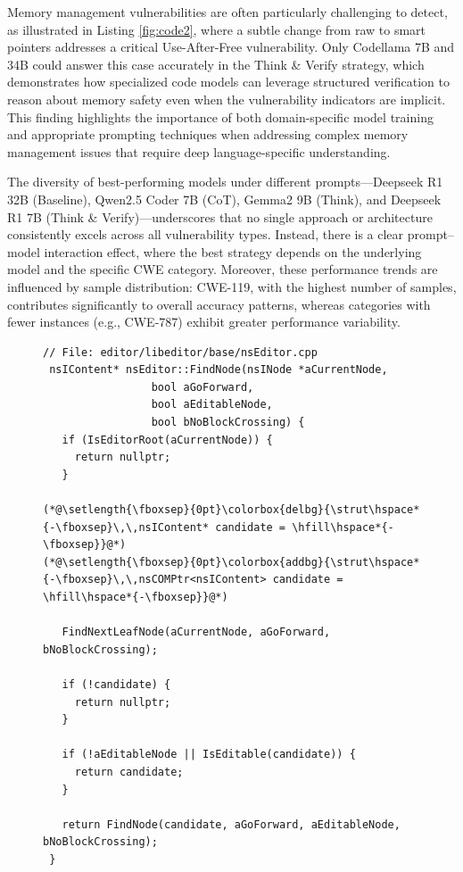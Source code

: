 \documentclass[sigconf]{acmart}
\begin{document}
Memory management vulnerabilities are often particularly challenging to detect, as illustrated in Listing \ref{fig:code2}, where a subtle change from raw to smart pointers addresses a critical Use-After-Free vulnerability. Only Codellama 7B and 34B could answer this case accurately in the Think \& Verify strategy, which demonstrates how specialized code models can leverage structured verification to reason about memory safety even when the vulnerability indicators are implicit. This finding highlights the importance of both domain-specific model training and appropriate prompting techniques when addressing complex memory management issues that require deep language-specific understanding.

The diversity of best-performing models under different prompts—Deepseek R1 32B (Baseline), Qwen2.5 Coder 7B (CoT), Gemma2 9B (Think), and Deepseek R1 7B (Think \& Verify)—underscores that no single approach or architecture consistently excels across all vulnerability types. Instead, there is a clear prompt–model interaction effect, where the best strategy depends on the underlying model and the specific CWE category. Moreover, these performance trends are influenced by sample distribution: CWE-119, with the highest number of samples, contributes significantly to overall accuracy patterns, whereas categories with fewer instances (e.g., CWE-787) exhibit greater performance variability.

\begin{figure}[ht]
\centering
\begin{lstlisting}[style=cstylediff,
  caption={CVE-2012-4213 (CWE-416: Use-After-Free) in Mozilla's \texttt{nsEditor::FindNode}. The vulnerable version (red) uses a raw pointer for \texttt{candidate}, leading to potential use-after-free issues. The patched version (green) replaces it with an \texttt{nsCOMPtr}, a smart pointer that ensures automatic reference counting, preventing premature deallocation.},
  label={fig:code2}]
 // File: editor/libeditor/base/nsEditor.cpp 
 nsIContent* nsEditor::FindNode(nsINode *aCurrentNode,
                 bool aGoForward,
                 bool aEditableNode,
                 bool bNoBlockCrossing) {
   if (IsEditorRoot(aCurrentNode)) { 
     return nullptr;
   }

(*@\setlength{\fboxsep}{0pt}\colorbox{delbg}{\strut\hspace*{-\fboxsep}\,\,nsIContent* candidate = \hfill\hspace*{-\fboxsep}}@*)
(*@\setlength{\fboxsep}{0pt}\colorbox{addbg}{\strut\hspace*{-\fboxsep}\,\,nsCOMPtr<nsIContent> candidate = \hfill\hspace*{-\fboxsep}}@*)

   FindNextLeafNode(aCurrentNode, aGoForward, bNoBlockCrossing);

   if (!candidate) {
     return nullptr;
   }

   if (!aEditableNode || IsEditable(candidate)) {
     return candidate;
   }

   return FindNode(candidate, aGoForward, aEditableNode, bNoBlockCrossing);
 }
\end{lstlisting}
\end{figure}
\end{document}
